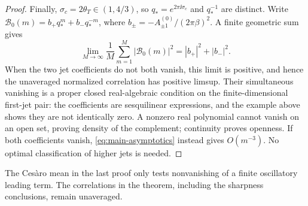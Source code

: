 \begin{proof}
Finally, \(\sigma_c=2\theta_T\in(1,4/3)\), so
\(q_*=e^{2\pi\ii\sigma_c}\) and \(q_*^{-1}\) are distinct. Write
\(\mathcal B_0(m)=b_+q_*^m+b_-q_*^{-m}\), where
\(b_\pm=-A_{\pm1}^{(0)}/(2\pi\beta)^2\). A finite geometric sum gives
\[
 \lim_{M\to\infty}\frac1M\sum_{m=1}^M|\mathcal B_0(m)|^2
 =|b_+|^2+|b_-|^2.
\]
When the two jet coefficients do not both vanish, this limit is positive,
and hence the unaveraged normalized correlation has positive limsup.
Their simultaneous vanishing is a proper closed real-algebraic condition
on the finite-dimensional first-jet pair: the coefficients are
sesquilinear expressions, and the example above shows they are not
identically zero. A nonzero real polynomial cannot vanish on an open
set, proving density of the complement; continuity proves openness.
If both coefficients vanish, \eqref{eq:main-asymptotics} instead gives
\(O(m^{-3})\). No optimal classification of higher jets is needed.
\end{proof}

The Ces\`aro mean in the last proof only tests nonvanishing of a finite
oscillatory leading term. The correlations in the theorem, including the
sharpness conclusions, remain unaveraged.
